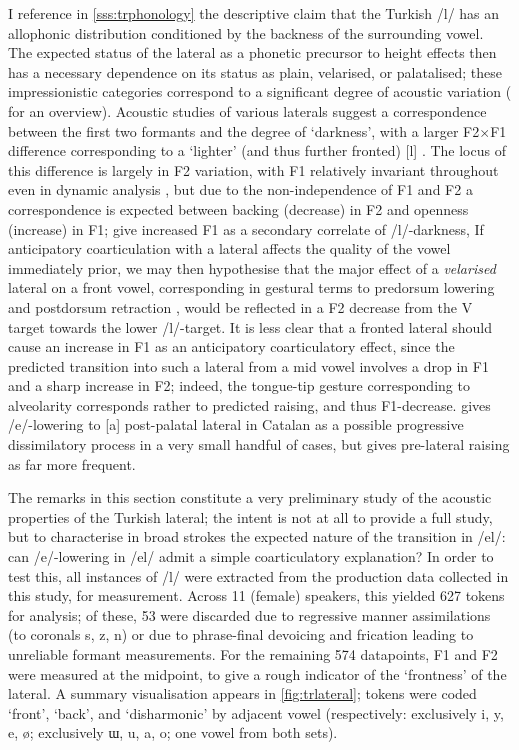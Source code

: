 I reference in \cref{sss:trphonology} the descriptive claim that the Turkish /l/ has an allophonic distribution conditioned by the backness of the surrounding vowel. The expected status of the lateral as a phonetic precursor to height effects then has a necessary dependence on its status as plain, velarised, or palatalised; these impressionistic categories correspond to a significant degree of acoustic variation (\citealt{Proctor2009} for an overview). Acoustic studies of various laterals suggest a correspondence between the first two formants and the degree of `darkness', with a larger F2$\times$F1 difference corresponding to a `lighter' (and thus further fronted) [l] \citep{Sproat1993,Turton2014,Carter2002,Recasens2005}. The locus of this difference is largely in F2 variation, with F1 relatively invariant throughout even in dynamic analysis \citep{Strycharczuk2016}, but due to the non-independence of F1 and F2 a correspondence is expected between backing (decrease) in F2 and openness (increase) in F1; \cite{Sproat1993,Carter2007} give increased F1 as a secondary correlate of /l/-darkness,  If anticipatory coarticulation with a lateral affects the quality of the vowel immediately prior, we may then hypothesise that the major effect of a \emph{velarised} lateral on a front vowel, corresponding in gestural terms to predorsum lowering and postdorsum retraction \citep{Recasens2012}, would be reflected in a F2 decrease from the V target towards the lower /l/-target. It is less clear that a fronted lateral should cause an increase in F1 as an anticipatory coarticulatory effect, since the predicted transition into such a lateral from a mid vowel involves a drop in F1 and a sharp increase in F2; indeed, the tongue-tip gesture corresponding to alveolarity corresponds rather to predicted raising, and thus F1-decrease. \cite{Recasens2014} gives /e/-lowering to [a] post-palatal lateral in Catalan as a possible progressive dissimilatory process in a very small handful of cases, but gives pre-lateral raising as far more frequent. 

The remarks in this section constitute a very preliminary study of the acoustic properties of the Turkish lateral; the intent is not at all to provide a full study, but to characterise in broad strokes the expected nature of the transition in /el/: can /e/-lowering in /el/ admit a simple coarticulatory explanation? In order to test this, all instances of /l/ were extracted from the production data collected in this study, for measurement. Across 11 (female) speakers, this yielded 627 tokens for analysis; of these, 53 were discarded due to regressive manner assimilations (to coronals s, z, n) or due to phrase-final devoicing and frication leading to unreliable formant measurements. For the remaining 574 datapoints, F1 and F2 were measured at the midpoint, to give a rough indicator of the `frontness' of the lateral. A summary visualisation appears in \cref{fig:trlateral}; tokens were coded `front', `back', and `disharmonic' by adjacent vowel (respectively: exclusively i, y, e, \o; exclusively ɯ, u, a, o; one vowel from both sets).

